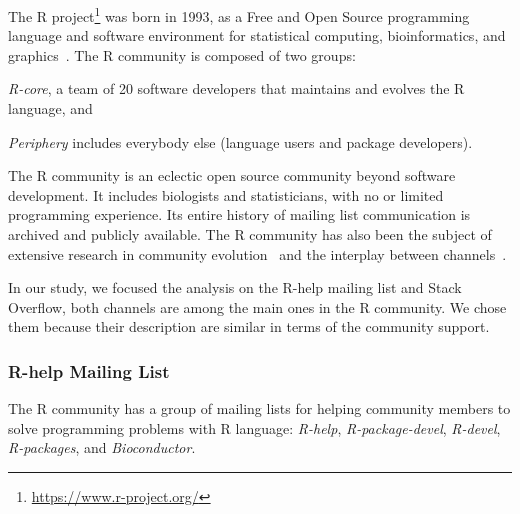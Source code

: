 The R project\footnote{\url{https://www.r-project.org/}} was born in 1993, as a Free and Open Source programming language and software environment for statistical computing, bioinformatics, and graphics~\cite{Ihaka1996}.
The R community is composed of two groups:
\begin{enumerate*}[label=(\arabic*)]
  \item \textit{R-core}, a team of 20 software developers that maintains and evolves the R language, and
  \item \textit{Periphery} includes everybody else (language users and package developers).
\end{enumerate*}

    The R community is an eclectic open source community beyond software development.
    It includes biologists and statisticians, with no or limited programming experience.
    Its entire history of mailing list communication is archived and publicly available.
    The R community has also been the subject of extensive research in community evolution~\cite{German2013} and the interplay between channels~\cite{Vasilescu2014c}.

    In our study, we focused the analysis on the R-help mailing list and Stack Overflow, both channels are among the main ones in the R community.
    We chose them because their description are similar in terms of the community support.

\subsubsection{R-help Mailing List}
    The R community has a group of mailing lists for helping community members to solve programming problems with R language: \emph{R-help}, \emph{R-package-devel}, \emph{R-devel}, \emph{R-packages}, and \emph{Bioconductor}.

